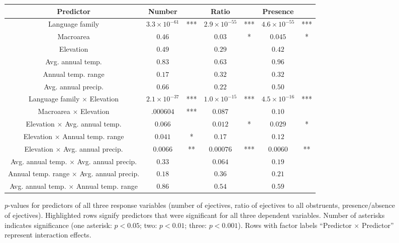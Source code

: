 \documentclass{article}
\begin{document}
\begin{figure}
	\centering
	\begin{tabular}{ccccccc}
		\toprule
		\textbf{Predictor} & \textbf{Number} & & \textbf{Ratio} & & \textbf{Presence} & \\
		\midrule
		\rowcolor{yellow} Language family & $3.3 \times 10^{-61}$ & *** & $2.9 \times 10^{-55}$ & *** & $4.6 \times 10^{-55}$ & *** \\
		Macroarea & $0.46$ & & $0.03$ & * & $0.045$ & * \\
		Elevation & $0.49$ & & $0.29$ & & $0.42$ & \\
		Avg. annual temp. & $0.83$ & & $0.63$ & & $0.96$ & \\
		Annual temp. range & $0.17$ & & $0.32$ & & $0.32$ & \\
		Avg. annual precip. & $0.66$ & & $0.22$ & & $0.50$ & \\
		\rowcolor{yellow} Language family $\times$ Elevation & $2.1 \times 10^{-37}$ & *** & $1.0 \times 10^{-15}$ & *** & $4.5 \times 10^{-16}$ & *** \\
		Macroarea $\times$ Elevation & $.000604$ & *** & $0.087$ & & $0.10$ & \\
		Elevation $\times$ Avg. annual temp. & $0.066$ & & $0.012$ & * & $0.029$ & * \\
		Elevation $\times$ Annual temp. range & $0.041$ & * & $0.17$ & & $0.12$ & \\
		\rowcolor{yellow} Elevation $\times$ Avg. annual precip. & $0.0066$ & ** & $0.00076$ & *** & $0.0060$ & ** \\
		Avg. annual temp. $\times$ Avg. annual precip. & $0.33$ & & $0.064$ & & $0.19$ & \\
		Annual temp. range $\times$ Avg. annual precip. & $0.18$ & & $0.36$ & & $0.21$ & \\
		Avg. annual temp. $\times$ Annual temp. range & $0.86$ & & $0.54$ & & $0.59$ & \\
		\bottomrule
	\end{tabular}
	\caption{$p$-values for predictors of all three response variables (number of ejectives, ratio of ejectives to all obstruents, presence/absence of ejectives). Highlighted rows signify predictors that were significant for all three dependent variables. Number of asterisks indicates significance (one asterisk: $p < 0.05$; two: $p < 0.01$; three: $p < 0.001$). Rows with factor labels ``Predictor $\times$ Predictor'' represent interaction effects.}
	\label{fig:pvals}
\end{figure}
\end{document}
